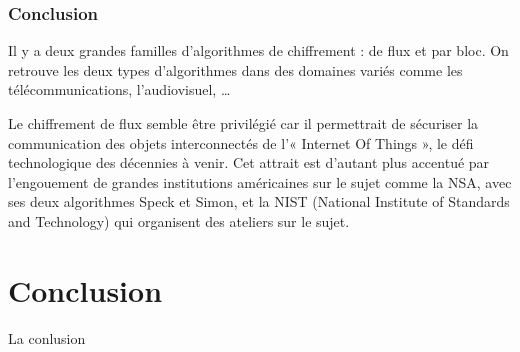 	\section{Conclusion}

	Il y a deux grandes familles d'algorithmes de chiffrement : de flux et par bloc.
	On retrouve les deux types d'algorithmes dans des domaines variés comme les télécommunications, l'audiovisuel, \dots

	Le chiffrement de flux semble être privilégié car il permettrait de sécuriser la communication des objets interconnectés de l'« Internet Of Things », le défi technologique des décennies à venir.
	Cet attrait est d'autant plus accentué par l'engouement de grandes institutions américaines sur le sujet comme la NSA, avec ses deux algorithmes Speck et Simon, et la NIST (National Institute of Standards and Technology) qui organisent des ateliers sur le sujet.

\newpage
\part*{Conclusion}

		La conlusion
